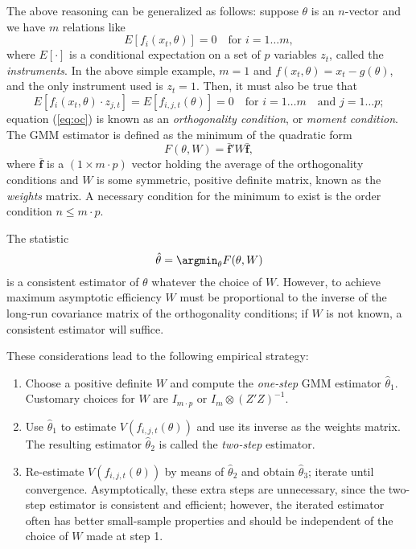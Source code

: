 The above reasoning can be generalized as follows: suppose $\theta$ is
an $n$-vector and we have $m$ relations like
\begin{equation}
  \label{eq:GMMgeneral}
  E \left[ f_i(x_t, \theta) \right] = 0 \quad\textrm{for\ } i=1 \ldots
  m ,
\end{equation}
where $E[\cdot]$ is a conditional expectation on a set of $p$
variables $z_t$, called the \emph{instruments}. In the above simple
example, $m=1$ and $f(x_t, \theta) = x_t - g(\theta)$, and the only
instrument used is $z_t = 1$. Then, it must also be true that
\begin{equation}
  \label{eq:oc}
  E \left[ f_i(x_t, \theta) \cdot z_{j,t} \right] = E \left[ f_{i,j,t}(\theta) \right] = 
  0 \quad\textrm{for\ } i=1 \ldots
  m \quad\textrm{and \ } j=1 \ldots p;
\end{equation}
equation (\ref{eq:oc}) is known as an \emph{orthogonality condition},
or \emph{moment condition}. The GMM estimator is defined as the
minimum of the quadratic form
\begin{equation}
  \label{eq:obj-general}
  F(\theta, W) = \bar{\mathbf{f}}' W \bar{\mathbf{f}},
\end{equation}
where $\bar{\mathbf{f}}$ is a $(1 \times m\cdot p)$ vector holding the
average of the orthogonality conditions and $W$ is some symmetric,
positive definite matrix, known as the \emph{weights} matrix. A
necessary condition for the minimum to exist is the order condition $n
\le m \cdot p$. 

The statistic
\begin{equation}
  \label{eq:gmmestimator}
  \hat{\theta} = \argmin_{\theta} F(\theta, W)
\end{equation}
is a consistent estimator of $\theta$ whatever the choice of $W$.
However, to achieve maximum asymptotic efficiency $W$ must be
proportional to the inverse of the long-run covariance matrix of the
orthogonality conditions; if $W$ is not known, a consistent estimator
will suffice.

These considerations lead to the following empirical strategy:
\begin{enumerate}
\item Choose a positive definite $W$ and compute the
  \emph{one-step} GMM estimator $\hat{\theta}_1$. Customary choices
  for $W$ are $I_{m\cdot p}$ or $I_{m} \otimes (Z'Z)^{-1}$.
\item Use $\hat{\theta}_1$ to estimate $V(f_{i,j,t}(\theta))$ and use its
  inverse as the weights matrix. The resulting estimator
  $\hat{\theta}_2$ is called the \emph{two-step} estimator.
\item Re-estimate $V(f_{i,j,t}(\theta))$ by means of $\hat{\theta}_2$ and
  obtain $\hat{\theta}_3$; iterate until convergence. Asymptotically,
  these extra steps are unnecessary, since the two-step estimator is
  consistent and efficient; however, the iterated estimator often has
  better small-sample properties and should be independent of the
  choice of $W$ made at step 1. 
\end{enumerate}

